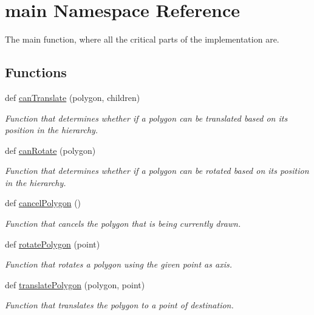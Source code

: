 \hypertarget{namespacemain}{}\section{main Namespace Reference}
\label{namespacemain}


The main function, where all the critical parts of the implementation are.  


\subsection*{Functions}
\begin{DoxyCompactItemize}
\item 
def \hyperlink{namespacemain_a88fcd4aa7193703d53a8095e78a40fe9}{can\+Translate} (polygon, children)
\begin{DoxyCompactList}\small\item\em Function that determines whether if a polygon can be translated based on its position in the hierarchy. \end{DoxyCompactList}\item 
def \hyperlink{namespacemain_ae1d466859928a06baa89a7b9279f4fa1}{can\+Rotate} (polygon)
\begin{DoxyCompactList}\small\item\em Function that determines whether if a polygon can be rotated based on its position in the hierarchy. \end{DoxyCompactList}\item 
\mbox{\label{namespacemain_a9641b8c073c7079e597f39b5f7f6cf0d}} 
def \hyperlink{namespacemain_a9641b8c073c7079e597f39b5f7f6cf0d}{cancel\+Polygon} ()
\begin{DoxyCompactList}\small\item\em Function that cancels the polygon that is being currently drawn. \end{DoxyCompactList}\item 
def \hyperlink{namespacemain_abfe7963151804b73036937ad486f55ac}{rotate\+Polygon} (point)
\begin{DoxyCompactList}\small\item\em Function that rotates a polygon using the given point as axis. \end{DoxyCompactList}\item 
def \hyperlink{namespacemain_adeb2cd76f03836777dd43cb9bc133d89}{translate\+Polygon} (polygon, point)
\begin{DoxyCompactList}\small\item\em Function that translates the polygon to a point of destination. \end{DoxyCompactList}\item 

\end{DoxyCompactItemize}
